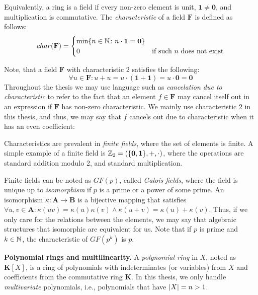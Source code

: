 Equivalently, a ring is a field if every non-zero element is unit, $\mathbf{1} \neq \mathbf{0}$, 
and multiplication is commutative. 
The \emph{characteristic} of a field $\mathbf{F}$ is defined as follows:
\begin{equation}
  char(\mathbf{F}) =
    \begin{cases}
      \min\{n \in \mathbb N \colon n \cdot \mathbf{1} = \mathbf{0} \}\\
      0 & \text{if such $n$ does not exist}\\
    \end{cases}       
\end{equation}

Note, that a field $\mathbf{F}$ with 
characteristic 2 satisfies the following:
\[
  \forall u \in \mathbf{F} \colon u + u = u \cdot (\mathbf 1 + \mathbf 1) = u \cdot \mathbf 0 = \mathbf 0
\]
Throughout the thesis we may use language such as \emph{cancelation due to characteristic} to 
refer to the fact that an element $f \in \mathbf{F}$ may cancel itself out in an expression if 
$\mathbf{F}$ has non-zero characteristic. 
We mainly use characteristic 2 in this thesis, and thus, we may say that 
$f$ cancels out due to characteristic when 
it has an even coefficient: 

Characteristics are prevalent in \emph{finite fields}, where the set of elements is finite. 
A simple example of a finite field is $\mathbb Z_2 = (\{\mathbf{0}, \mathbf{1}\}, +, \cdot)$, where 
the operations are standard addition modulo 2, and standard multiplication. 

Finite fields can be noted as $GF(p)$, called \emph{Galois fields}, where the field is unique 
up to \emph{isomorphism} if $p$ is a prime or a power of some prime. 
An isomorphism $\kappa \colon \mathbf{A} \to \mathbf{B}$ 
is a bijective mapping that satisfies 
$\forall u,v \in \mathbf{A} \colon \kappa(uv) = \kappa(u)\kappa(v) \wedge \kappa(u+v) = \kappa(u)+\kappa(v).$ 
Thus, if we only care for the relations between the elements, 
we may say that algebraic structures that isomorphic are 
equivalent for us. 
Note that if $p$ is prime and $k \in \mathbb N$, the characteristic of $GF(p^k)$ is $p$. 

\textbf{Polynomial rings and multilinearity.} 
A \emph{polynomial ring} in $X$, noted as $\mathbf{K}[X]$,
is a ring of polynomials with indeterminates (or variables) from $X$ and 
coefficients from the commutative ring $\mathbf{K}$. 
In this thesis, we only handle \emph{multivariate} 
polynomials, i.e., polynomials that have ${\left\vert X\right\vert} = n > 1$. 

